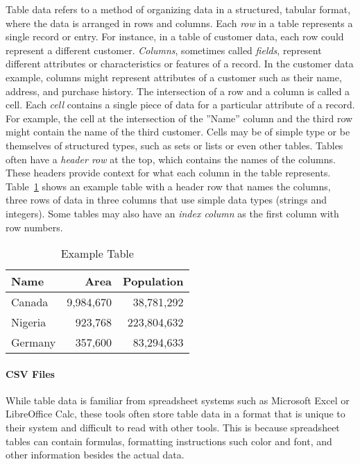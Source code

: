 Table data refers to a method of organizing data in a structured, tabular format, where the data is arranged in rows and columns. Each \emph{row} in a table represents a single record or entry. For instance, in a table of customer data, each row could represent a different customer. \emph{Columns}, sometimes called \emph{fields}, represent different attributes or characteristics or features of a record. In the customer data example, columns might represent attributes of a customer such as their name, address, and purchase history. The intersection of a row and a column is called a cell. Each \emph{cell} contains a single piece of data for a particular attribute of a record. For example, the cell at the intersection of the ''Name'' column and the third row might contain the name of the third customer. Cells may be of simple type or be themselves of structured types, such as sets or lists or even other tables. Tables often have a \emph{header row} at the top, which contains the names of the columns. These headers provide context for what each column in the table represents. Table~\ref{tab:exampletable} shows an example table with a header row that names the columns, three rows of data in three columns that use simple data types (strings and integers). Some tables may also have an \emph{index column} as the first column with row numbers. 

\begin{table}[b]
\centering
\renewcommand{\arraystretch}{1.25}

\begin{tabular}{l|r|r} \hline
\textbf{Name} & \textbf{Area} & \textbf{Population} \\ \hline
Canada & 9,984,670 & 38,781,292  \\
Nigeria & 923,768 & 223,804,632 \\
Germany & 357,600 & 83,294,633 \\ \hline
\end{tabular}
\caption{Example Table}
\label{tab:exampletable}
\end{table}

\paragraph*{CSV Files}

While table data is familiar from spreadsheet systems such as Microsoft Excel or LibreOffice Calc, these tools often store table data in a format that is unique to their system and difficult to read with other tools. This is because spreadsheet tables can contain formulas, formatting instructions such color and font, and other information besides the actual data.

